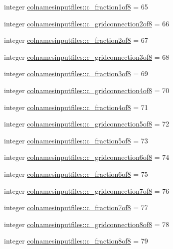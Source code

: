 \begin{DoxyCompactItemize}
integer \hyperlink{namespacecolnamesinputfiles_ac2b1ccc8ae6ee69034ca23703f5557be}{colnamesinputfiles\+::c\+\_\+fraction1of8} = 65
\item 
integer \hyperlink{namespacecolnamesinputfiles_ab7547e93170074b4d8a1f092873025d7}{colnamesinputfiles\+::c\+\_\+gridconnection2of8} = 66
\item 
integer \hyperlink{namespacecolnamesinputfiles_a9e8fc5ec0c0d392b768329df0ba35ae8}{colnamesinputfiles\+::c\+\_\+fraction2of8} = 67
\item 
integer \hyperlink{namespacecolnamesinputfiles_a0a5d0387553b34f4035c1a5492b2b708}{colnamesinputfiles\+::c\+\_\+gridconnection3of8} = 68
\item 
integer \hyperlink{namespacecolnamesinputfiles_a7dc4f8fad3fcfba44f0c11887c982d0a}{colnamesinputfiles\+::c\+\_\+fraction3of8} = 69
\item 
integer \hyperlink{namespacecolnamesinputfiles_a94605351c2bc647a9ab4b50d7ba81e1c}{colnamesinputfiles\+::c\+\_\+gridconnection4of8} = 70
\item 
integer \hyperlink{namespacecolnamesinputfiles_a092d6542451ef7d49fb50b3504355de5}{colnamesinputfiles\+::c\+\_\+fraction4of8} = 71
\item 
integer \hyperlink{namespacecolnamesinputfiles_a09cb69ff74d4afb51c51777f9fccff6b}{colnamesinputfiles\+::c\+\_\+gridconnection5of8} = 72
\item 
integer \hyperlink{namespacecolnamesinputfiles_abc1fddbcf2bc7e7888dff943c4a34d25}{colnamesinputfiles\+::c\+\_\+fraction5of8} = 73
\item 
integer \hyperlink{namespacecolnamesinputfiles_acae555cfa7c96195f0f67c38e46b7871}{colnamesinputfiles\+::c\+\_\+gridconnection6of8} = 74
\item 
integer \hyperlink{namespacecolnamesinputfiles_a23cba8a25cd6aeafcb11be5adfa89e21}{colnamesinputfiles\+::c\+\_\+fraction6of8} = 75
\item 
integer \hyperlink{namespacecolnamesinputfiles_a749a3e57d412ea8b71e6e7a1cbddd11d}{colnamesinputfiles\+::c\+\_\+gridconnection7of8} = 76
\item 
integer \hyperlink{namespacecolnamesinputfiles_a92a1fd944f732b14683407980521496e}{colnamesinputfiles\+::c\+\_\+fraction7of8} = 77
\item 
integer \hyperlink{namespacecolnamesinputfiles_acf30958a5c5ea1ff51ecae398f3ebf4e}{colnamesinputfiles\+::c\+\_\+gridconnection8of8} = 78
\item 
integer \hyperlink{namespacecolnamesinputfiles_ac1ff83c3a5cb074f626d5c76e069a319}{colnamesinputfiles\+::c\+\_\+fraction8of8} = 79

\end{DoxyCompactItemize}
